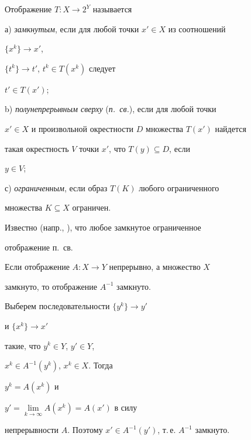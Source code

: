 \begin{defn}


Отображение $T: X \rightarrow 2^{Y}$ называется 





а) {\it замкнутым}, если для любой точки $x' \in X$ из соотношений 


$\{ x^{k} \} \rightarrow x'$,


$\{ t^{k} \} \rightarrow t'$, $t^{k} \in T(x^{k})$ следует 


$t' \in T(x')$;





b) {\it полунепрерывным сверху} ({\it п.~св.}), если для любой точки 


$x' \in X$ и произвольной окрестности $D$ множества $T(x')$ найдется 


такая окрестность $V$ точки $x'$, что $T(y) \subseteq D$, если 


$y \in V$;





с) {\it ограниченным}, если образ $T(K)$ любого ограниченного 


множества $K \subseteq X$ ограничен.


\end{defn}





Известно (напр., \cite{BGM81}), что любое замкнутое ограниченное 


отображение п.~св.





\begin{lem} \label{lm:1}


Если отображение $A: X \rightarrow Y$ непрерывно, а множество $X$ 


замкнуто, то отображение $A^{-1}$ замкнуто. 


\end{lem}





\begin{pf}


Выберем последовательности $\{y^{k} \} \rightarrow y'$


и $\{x^{k} \} \rightarrow x'$


такие, что $y^{k} \in Y$, $y' \in Y$,


$x^{k} \in A^{-1}(y^{k})$, $x^{k} \in X$. Тогда 


$y^{k}=A(x^{k})$ и


$y'=\lim\limits_{k \rightarrow \infty } A(x^{k})=A(x')$ в силу 


непрерывности $A$. Поэтому $x' \in A^{-1}(y')$, т.\,е. $A^{-1}$ замкнуто. 


\end{pf}





